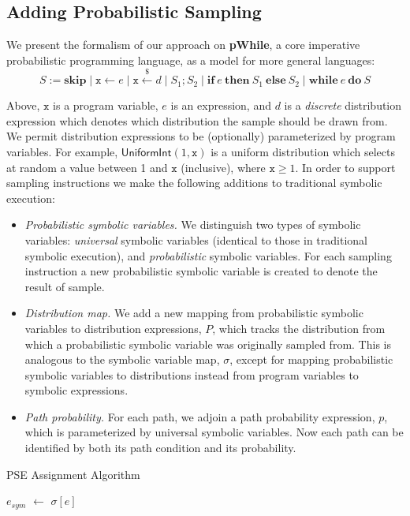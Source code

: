 \documentclass[acmsmall,review]{acmart}\settopmatter{}
\newcommand*\Let[2]{\State #1 $\gets$ #2}
\begin{document}
	
	\subsection{Adding Probabilistic Sampling}
	We present the formalism of our approach on \textbf{pWhile}, a core imperative probabilistic programming language, as a model for more general languages:
	\[
	S := \mathbf{skip} \mid \mathtt{x} \leftarrow e \mid \mathtt{x} \xleftarrow{\$} d \mid S_1 ; S_2 \mid \mathbf{if}~e~\mathbf{then}~S_1~\mathbf{else}~S_2 \mid \mathbf{while}~e~\mathbf{do}~S 
	\]
	
	Above, $\mathtt{x}$ is a program variable, $e$ is an expression, and $d$ is a \textit{discrete} distribution expression which denotes which distribution the sample should be drawn from.
	We permit distribution expressions to be (optionally) parameterized by program variables.
	For example, $\mathsf{UniformInt}(1,\mathtt{x})$ is a uniform distribution which selects at random a value between 1 and $\mathtt{x}$ (inclusive), where $\mathtt{x} \geq 1$.
	In order to support sampling instructions we make the following additions to traditional symbolic execution:
	\begin{itemize}
		\item \textit{Probabilistic symbolic variables.} We distinguish two types of symbolic variables: \textit{universal} symbolic variables (identical to those in traditional symbolic execution), and \textit{probabilistic} symbolic variables.
		For each sampling instruction a new probabilistic symbolic variable is created to denote the result of sample.
		\item \textit{Distribution map.} We add a new mapping from probabilistic symbolic variables to distribution expressions, $P$, which tracks the distribution from which a probabilistic symbolic variable was originally sampled from.
		This is analogous to the symbolic variable map, $\sigma$, except for mapping probabilistic symbolic variables to distributions instead from program variables to symbolic expressions.
		\item \textit{Path probability.} For each path, we adjoin a path probability expression, $p$, which is parameterized by universal symbolic variables.
		Now each path can be identified by both its path condition and its probability.
	\end{itemize}
	
	\begin{algorithm}[H]
		\caption{PSE Assignment Algorithm}
		\label{alg:assign}
		\begin{algorithmic}[1]
			\Let{$e_{sym}$}{$\sigma[e]$}
			\State{$\sigma[\mathtt{x}] = e_{sym}$}
			\State{}
			\EndFunction
		\end{algorithmic}
	\end{algorithm}
	
\end{document}
